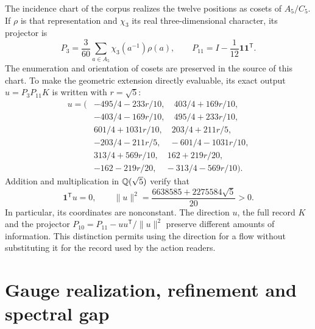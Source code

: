 \documentclass[a4paper,10pt]{article}
\theoremstyle{definition}\newtheorem{definition}[theorem]{Definition}
\theoremstyle{remark}\newtheorem{remark}[theorem]{Remark}
\numberwithin{equation}{section}
\begin{document}
The incidence chart of the corpus realizes the twelve positions as cosets
of \(A_5/C_5\). If \(\rho\) is that representation and \(\chi_3\) its
real three-dimensional character, its projector is
\[
 P_3=\frac3{60}\sum_{a\in A_5}\chi_3(a^{-1})\rho(a),\qquad
 P_{11}=I-\frac1{12}\mathbf1\mathbf1^{\mathsf T}.
\]
The enumeration and orientation of cosets are preserved in the source of
this chart. To make the geometric extension directly evaluable,
its exact output \(u=P_3P_{11}K\) is written with \(r=\sqrt5\):
\begin{equation}
\begin{split}
u=\bigl(&-495/4-233r/10,\quad403/4+169r/10,\\
&-403/4-169r/10,\quad495/4+233r/10,\\
&601/4+1031r/10,\quad203/4+211r/5,\\
&-203/4-211r/5,\quad-601/4-1031r/10,\\
&313/4+569r/10,\quad162+219r/20,\\
&-162-219r/20,\quad-313/4-569r/10\bigr).
\end{split}
\label{eq:u-main}
\end{equation}
Addition and multiplication in \(\mathbb Q(\sqrt5)\) verify that
\[
 \mathbf1^{\mathsf T}u=0,\qquad
 \|u\|^2=\frac{6638585+2275584\sqrt5}{20}>0.
\]
In particular, its coordinates are nonconstant. The direction \(u\),
the full record \(K\) and the projector
\(P_{10}=P_{11}-uu^{\mathsf T}/\|u\|^2\) preserve different amounts
of information. This distinction permits using the direction for a
flow without substituting it for the record used by the action readers.




















\clearpage
\part{Gauge realization, refinement and spectral gap}






\end{document}
